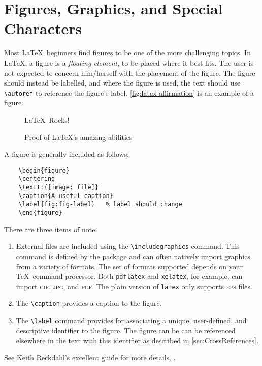 \section{Figures, Graphics, and Special Characters}
\label{sec:Graphics}

Most \LaTeX\ beginners find figures to be one of the more challenging
topics.  In \LaTeX, a figure is a \emph{floating element}, to be
placed where it best fits.
The user is not expected to concern him/herself with the placement
of the figure.  The figure should instead be labelled, and where
the figure is used, the text should use \verb+\autoref+ to reference
the figure's label.
\autoref{fig:latex-affirmation} is an example of a figure.
\begin{figure}
    \centering
    \Huge{\textsf{\LaTeX\ Rocks!}}
    \caption{Proof of \LaTeX's amazing abilities}
    \label{fig:latex-affirmation}   %
\end{figure}
A figure is generally included as follows:
\begin{lstlisting}
    \begin{figure}
    \centering
    \texttt{[image: file]}
    \caption{A useful caption}
    \label{fig:fig-label}   % label should change
    \end{figure}
\end{lstlisting}
There are three items of note:
\begin{enumerate}
\item External files are included using the \verb+\includegraphics+
    command.  This command is defined by the  package
    and can often natively import graphics from a variety of formats.
    The set of formats supported depends on your \TeX\ command processor.
    Both \texttt{pdflatex} and \texttt{xelatex}, for example, can
    import \textsc{gif}, \textsc{jpg}, and \textsc{pdf}.  The plain
    version of \texttt{latex} only supports \textsc{eps} files.

\item The \verb+\caption+ provides a caption to the figure.

\item The \verb+\label+ command provides for associating a unique, user-defined,
    and descriptive identifier to the figure.  The figure can be
    can be referenced elsewhere in the text with this identifier
    as described in \autoref{sec:CrossReferences}.
\end{enumerate}
See Keith Reckdahl’s excellent guide for more details,
.

